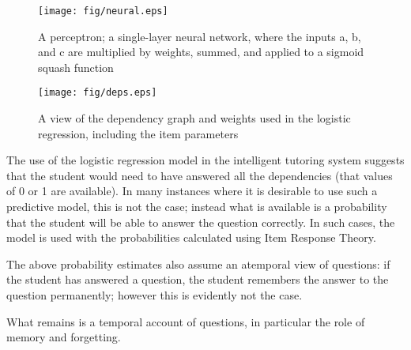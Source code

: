 \begin{figure}[!p]
\label{fig:neural}
  \centering\texttt{[image: fig/neural.eps]}
\caption{A perceptron; a single-layer neural network, where the inputs a, b, and c
are multiplied by weights, summed, and applied to a sigmoid squash function}
\end{figure}

\begin{figure}[!p]
\label{fig:deps}
  \centering\texttt{[image: fig/deps.eps]}
\caption{A view of the dependency graph and weights used in the logistic regression,
including the item parameters}
\end{figure}

The use of the logistic regression model in the intelligent tutoring system
suggests that the student would need to have answered all the dependencies
(that values of 0 or 1 are available).  In many instances where it is desirable
to use such a predictive model, this is not the case; instead what is available
is a probability that the student will be able to answer the question
correctly.  In such cases, the model is used with the probabilities calculated
using Item Response Theory.

The above probability estimates also assume an atemporal view of questions: if
the student has answered a question, the student remembers the answer to the
question permanently; however this is evidently not the case.  

What remains is a temporal account of questions, in particular the role of
memory and forgetting.



